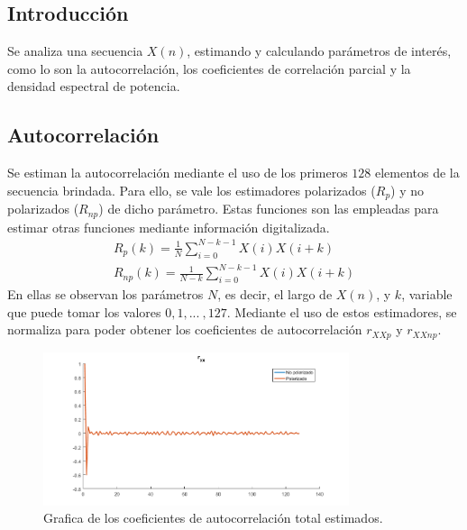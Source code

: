 



\subsection{Introducción}

Se analiza una secuencia $X(n)$, estimando y calculando parámetros de interés, como lo son la autocorrelación, los coeficientes de correlación parcial y la densidad espectral de potencia.

\subsection{Autocorrelación} 

Se estiman la autocorrelación mediante el uso de los primeros $128$ elementos de la secuencia brindada. Para ello, se vale los estimadores polarizados ($R_{p}$) y no polarizados ($R_{np}$) de dicho parámetro. Estas funciones son las empleadas para estimar otras funciones mediante información digitalizada.
\begin{equation}
\begin{gathered}
	R_{p}(k) = \frac{1}{N} \sum_{i=0}^{N-k-1} X(i)X(i+k)	\\
	R_{np}(k) = \frac{1}{N-k} \sum_{i=0}^{N-k-1} X(i)X(i+k)
\end{gathered}
\end{equation}
En ellas se observan los parámetros $N$, es decir, el largo de $X(n)$, y $k$, variable que puede tomar los valores $0, 1, ... \ , 127$. Mediante el uso de estos estimadores, se normaliza para poder obtener los coeficientes de autocorrelación $r_{XXp}$ y $r_{XXnp}$. 

\begin{figure}[H]
\centering
	\includegraphics[width=0.8\textwidth, trim = {0 0 0 0.7cm},clip]{./ImagenesEjercicio2/rxx.png}
	\caption{Grafica de los coeficientes de autocorrelación total estimados.}
	\label{fig:rxx}
\end{figure}

